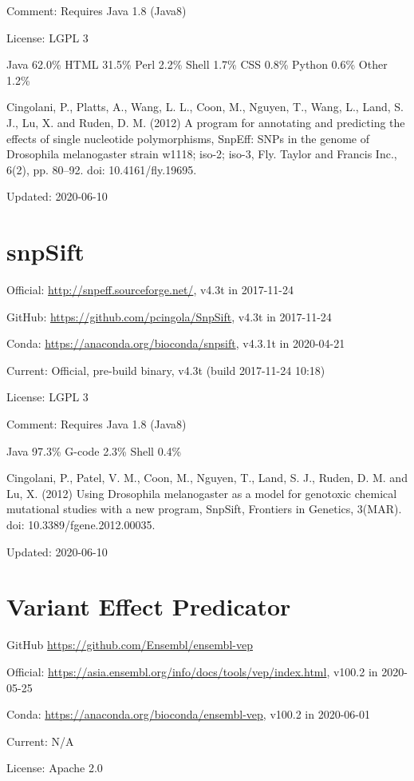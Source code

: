 \documentclass[]{article}
\begin{document}
Comment: Requires Java 1.8 (Java8)

License: LGPL 3

Java 62.0\% HTML 31.5\% Perl 2.2\% Shell 1.7\% CSS 0.8\% Python 0.6\% Other 1.2\%

Cingolani, P., Platts, A., Wang, L. L., Coon, M., Nguyen, T., Wang, L., Land, S. J., Lu, X. and Ruden, D. M. (2012) A program for annotating and predicting the effects of single nucleotide polymorphisms, SnpEff: SNPs in the genome of Drosophila melanogaster strain w1118; iso-2; iso-3, Fly. Taylor and Francis Inc., 6(2), pp. 80–92. doi: 10.4161/fly.19695.

Updated: 2020-06-10

\section{snpSift}

Official: \url{http://snpeff.sourceforge.net/}, v4.3t in 2017-11-24

GitHub: \url{https://github.com/pcingola/SnpSift}, v4.3t in 2017-11-24

Conda: \url{https://anaconda.org/bioconda/snpsift}, v4.3.1t in 2020-04-21

Current: Official, pre-build binary, v4.3t (build 2017-11-24 10:18)

License: LGPL 3

Comment: Requires Java 1.8 (Java8)

Java 97.3\% G-code 2.3\% Shell 0.4\%

Cingolani, P., Patel, V. M., Coon, M., Nguyen, T., Land, S. J., Ruden, D. M. and Lu, X. (2012) Using Drosophila melanogaster as a model for genotoxic chemical mutational studies with a new program, SnpSift, Frontiers in Genetics, 3(MAR). doi: 10.3389/fgene.2012.00035.

Updated: 2020-06-10


\section{Variant Effect Predicator}

GitHub \url{https://github.com/Ensembl/ensembl-vep}

Official: \url{https://asia.ensembl.org/info/docs/tools/vep/index.html}, v100.2 in 2020-05-25

Conda: \url{https://anaconda.org/bioconda/ensembl-vep}, v100.2 in 2020-06-01

Current: N/A

License: Apache 2.0
\end{document}
